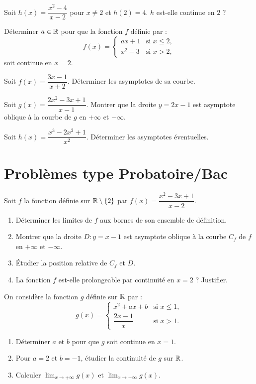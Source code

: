 \exo{}
Soit $h(x)=\dfrac{x^2-4}{x-2}$ pour $x\neq 2$ et $h(2)=4$. $h$ est-elle continue en $2$ ?

\exo{}
Déterminer $a\in\mathbb{R}$ pour que la fonction $f$ définie par :
\[
f(x)=\begin{cases}
ax+1 &\text{si } x\leq 2,\\
x^2-3 &\text{si } x>2,
\end{cases}
\]
soit continue en $x=2$.


\exo{}
Soit $f(x)=\dfrac{3x-1}{x+2}$. Déterminer les asymptotes de sa courbe.

\exo{}
Soit $g(x)=\dfrac{2x^2-3x+1}{x-1}$. Montrer que la droite $y=2x-1$ est asymptote oblique à la courbe de $g$ en $+\infty$ et $-\infty$.

\exo{}
Soit $h(x)=\dfrac{x^3-2x^2+1}{x^2}$. Déterminer les asymptotes éventuelles.

\section{Problèmes type Probatoire/Bac}

Soit $f$ la fonction définie sur $\mathbb{R}\setminus\{2\}$ par $f(x)=\dfrac{x^2-3x+1}{x-2}$.
\begin{enumerate}[label=\arabic*)]
\item Déterminer les limites de $f$ aux bornes de son ensemble de définition.
\item Montrer que la droite $D: y=x-1$ est asymptote oblique à la courbe $C_f$ de $f$ en $+\infty$ et $-\infty$.
\item Étudier la position relative de $C_f$ et $D$.
\item La fonction $f$ est-elle prolongeable par continuité en $x=2$ ? Justifier.
\end{enumerate}

On considère la fonction $g$ définie sur $\mathbb{R}$ par :
\[
g(x)=\begin{cases}
x^2+ax+b &\text{si } x\leq 1,\\
\dfrac{2x-1}{x} &\text{si } x>1.
\end{cases}
\]
\begin{enumerate}[label=\arabic*)]
\item Déterminer $a$ et $b$ pour que $g$ soit continue en $x=1$.
\item Pour $a=2$ et $b=-1$, étudier la continuité de $g$ sur $\mathbb{R}$.
\item Calculer $\displaystyle\lim_{x\to +\infty} g(x)$ et $\displaystyle\lim_{x\to -\infty} g(x)$.
\end{enumerate}

